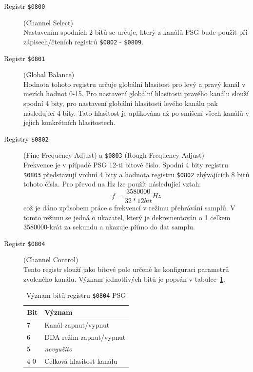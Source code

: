 \begin{description}
\item [Registr {\tt \$0800}] (Channel Select) \\
	Nastavením spodních 2 bitů se určuje, který z kanálů PSG bude použit
	při zápisech/čteních registrů {\tt \$0802} - {\tt \$0809}.

\item [Registr {\tt \$0801}] (Global Balance) \\
	Hodnota tohoto registru určuje globální hlasitost pro levý a pravý kanál v
	mezích hodnot 0-15. Pro nastavení globální hlasitosti pravého kanálu slouží
	spodní 4 bity, pro nastavení globální hlasitosti levého kanálu pak
	následující 4 bity. Tato hlasitost je aplikována až po smíšení všech kanálů
	v jejich konkrétních hlasitostech.

\item [Registry {\tt \$0802}] (Fine Frequency Adjust) a
	{\tt \$0803} (Rough Frequency Adjust) \\
	Frekvence je v případě PSG 12-ti bitové číslo. Spodní 4 bity registru {\tt
	\$0803} představují vrchní 4 bity a hodnota registru {\tt \$0802}
	zbývajících 8 bitů tohoto čísla. Pro převod na Hz lze použít následující
	vztah: $$ f = \frac{3580000}{32 * 12bit} Hz $$ což je dáno způsobem práce
	s frekvencí v režimu přehrávání samplů. V tomto režimu se jedná o ukazatel,
	který je dekrementován o 1 celkem 3580000-krát za sekundu a ukazuje přímo
	do dat samplu.

\item [Registr {\tt \$0804}] (Channel Control) \\
	Tento registr slouží jako bitové pole určené ke konfiguraci parametrů
	zvoleného kanálu. Význam jednotlivých bitů je popsán v
	tabulce~\ref{tab:psg_cr}.

	\begin{table}[ht]
	\begin{center}
	\begin{tabular}{|l|l|}
	\hline
	\textbf{Bit} & \textbf{Význam} \\
	\hline
		7 & Kanál zapnut/vypnut \\
		6 & DDA režim zapnut/vypnut \\
		5 & {\em nevyužito} \\
		4-0 & Celková hlasitost kanálu \\
	\hline
	\end{tabular}
	\end{center}
		\caption{Význam bitů registru {\tt \$0804} PSG\label{tab:psg_cr}}
	\end{table}


\end{description}

